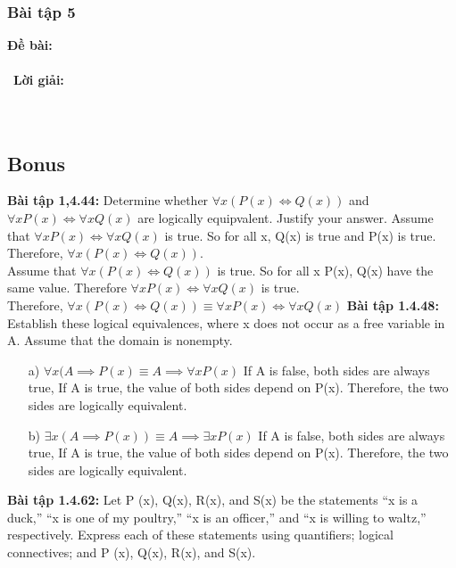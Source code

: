 \documentclass[a4paper]{article}
\begin{document}
\clearpage
\subsubsection{Bài tập 5}
\textbf{Đề bài:} 
\\\ \\\
\textbf{Lời giải:} \\\ \\\
\clearpage

\subsection{Bonus}
\textbf{Bài tập 1,4.44:} Determine whether $\forall x (P(x) \Leftrightarrow Q(x))$ and $\forall x P(x) \Leftrightarrow \forall x Q(x)$ are logically equipvalent. Justify your answer.
Assume that $\forall x P(x) \Leftrightarrow \forall x Q(x)$ is true. So for all x, Q(x) is true and P(x) is true. Therefore,  $\forall x (P(x) \Leftrightarrow Q(x))$.\\
Assume that  $\forall x (P(x) \Leftrightarrow Q(x))$ is true. So for all x P(x), Q(x) have the same value. Therefore $\forall x P(x) \Leftrightarrow \forall x Q(x)$ is true.\\
Therefore, $\forall x (P(x) \Leftrightarrow Q(x)) \equiv \forall x P(x) \Leftrightarrow \forall x Q(x)$
\textbf{Bài tập 1.4.48:} Establish these logical equivalences, where x does not occur as a free variable in A. Assume that the domain is nonempty.
\begin{enumerate}
	\item[a)] $\forall x (A \implies P(x) \equiv A \implies \forall x P(x)$
	If A is false, both sides are  always true, If A is true, the value of both sides depend on P(x). Therefore, the two sides are logically equivalent.
	\item[b)] $\exists x (A \implies P(x)) \equiv A \implies \exists x P(x)$
	If A is false, both sides are  always true, If A is true, the value of both sides depend on P(x). Therefore, the two sides are logically equivalent.
\end{enumerate}
\textbf{Bài tập 1.4.62:} Let P (x), Q(x), R(x), and S(x) be the statements “x is a duck,” “x is one of my poultry,” “x is an officer,” and “x is willing to waltz,” respectively. Express each of these statements using quantifiers; logical connectives; and P (x), Q(x), R(x), and S(x).
\end{document}
